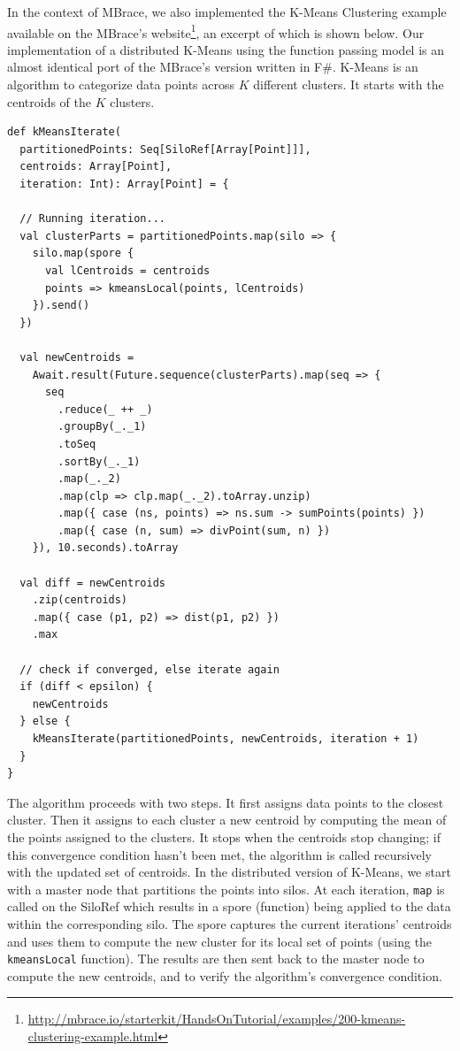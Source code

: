 \documentclass[preprint]{sigplanconf}
\theoremstyle{definition}
\theoremstyle{definition}
\begin{document}
In the context of MBrace, we also implemented the K-Means Clustering example
available on the MBrace's
website\footnote{\url{http://mbrace.io/starterkit/HandsOnTutorial/examples/200-kmeans-clustering-example.html}},
an excerpt of which is shown below. Our implementation of a distributed K-Means
using the function passing model is an almost identical port of the MBrace’s
version written in F\#. K-Means is an algorithm to categorize data points across
$K$ different clusters. It starts with the centroids of the $K$ clusters.

\begin{lstlisting}
def kMeansIterate(
  partitionedPoints: Seq[SiloRef[Array[Point]]],
  centroids: Array[Point],
  iteration: Int): Array[Point] = {

  // Running iteration...
  val clusterParts = partitionedPoints.map(silo => {
    silo.map(spore {
      val lCentroids = centroids
      points => kmeansLocal(points, lCentroids)
    }).send()
  })

  val newCentroids =
    Await.result(Future.sequence(clusterParts).map(seq => {
      seq
        .reduce(_ ++ _)
        .groupBy(_._1)
        .toSeq
        .sortBy(_._1)
        .map(_._2)
        .map(clp => clp.map(_._2).toArray.unzip)
        .map({ case (ns, points) => ns.sum -> sumPoints(points) })
        .map({ case (n, sum) => divPoint(sum, n) })
    }), 10.seconds).toArray

  val diff = newCentroids
    .zip(centroids)
    .map({ case (p1, p2) => dist(p1, p2) })
    .max

  // check if converged, else iterate again
  if (diff < epsilon) {
    newCentroids
  } else {
    kMeansIterate(partitionedPoints, newCentroids, iteration + 1)
  }
}
\end{lstlisting}

The algorithm proceeds with two steps. It first assigns data points to the
closest cluster. Then it assigns to each cluster a new centroid by computing the
mean of the points assigned to the clusters. It stops when the centroids stop
changing; if this convergence condition hasn't been met, the algorithm is called
recursively with the updated set of centroids. In the distributed version of
K-Means, we start with a master node that partitions the points into silos. At
each iteration, \verb|map| is called on the SiloRef which results in a spore
(function) being applied to the data within the corresponding silo. The spore
captures the current iterations' centroids and uses them to compute the new
cluster for its local set of points (using the \verb|kmeansLocal| function). The
results are then sent back to the master node to compute the new centroids, and
to verify the algorithm's convergence condition.
\end{document}
